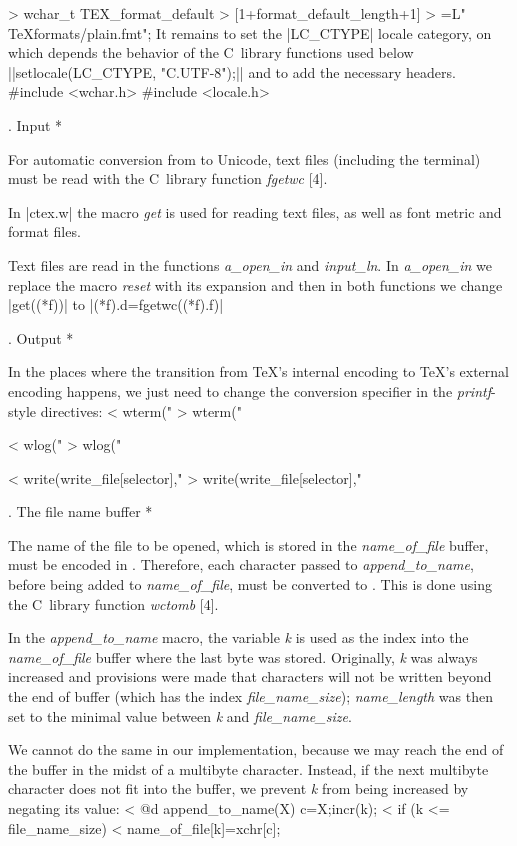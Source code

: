 > wchar_t TEX_format_default
>    [1+format_default_length+1]
>  =L" TeXformats/plain.fmt";
\endverbatim
\medskip
It remains to set the |LC_CTYPE| locale category, on which
depends the behavior of the C~library functions used below
||setlocale(LC_CTYPE, "C.UTF-8");||
and to add the necessary headers.
\verbatim
#include <wchar.h>
#include <locale.h>
\endverbatim

. Input *

For automatic conversion from  to Unicode,
text files (including the terminal) must be
read with the C~library function \hbox{\it fgetwc\/} [4].

In |ctex.w| the macro {\it get\/}
is used for reading text files, as well as
font metric and format files.

Text files are read in the functions
{\it a\_open\_in\/} and
{\it input\_ln\/}.
In
{\it a\_open\_in\/} we replace the macro
{\it reset\/}
with its expansion and then in both functions
we change |get((*f))| to |(*f).d=fgetwc((*f).f)|

. Output *

In the places where the transition from \TeX's internal encoding to
\TeX's external encoding happens, we just need to change the conversion specifier
in the {\it printf}-style directives:
\smallskip
\verbatim
< wterm("%c",xchr[s]);
> wterm("%lc",xchr[s]);

< wlog("%c",xchr[s]);
> wlog("%lc",xchr[s]);

< write(write_file[selector],"%c",xchr[s]);
> write(write_file[selector],"%lc",xchr[s]);
\endverbatim

. The file name buffer *

The name of the file to be opened, which is
stored in the {\it name\_of\_file\/} buffer,
must be encoded in \hbox{}.
Therefore, each character passed to {\it append\_to\_name\/},
before being added to {\it name\_of\_file\/},
must
be converted to \hbox{}. This is done using
the C~library function {\it wctomb\/} [4].

In the {\it append\_to\_name\/} macro, the variable
{\it k\/}
is used as the index into the {\it name\_of\_file\/} buffer
where the last byte was stored. Originally, {\it k\/} was
always increased and provisions were made
that characters will not be written beyond the end of buffer
(which has the index {\it file\_name\_size\/});
{\it name\_length\/} was then set to the minimal value
between {\it k\/} and {\it file\_name\_size\/}.

We cannot do the same in our implementation, because we may reach
the end of the buffer
in the midst of
a multibyte character. Instead, if the next multibyte
character does not fit into the buffer, we prevent {\it k\/} from
being increased by negating its value:
\verbatim
< @d append_to_name(X) { c=X;incr(k);
<   if (k <= file_name_size)
<     name_of_file[k]=xchr[c]; } 

